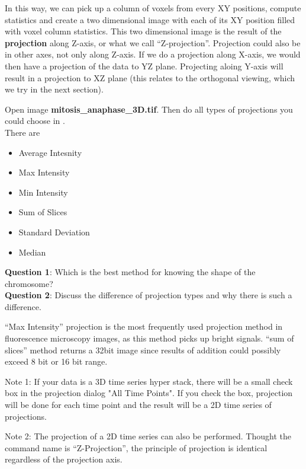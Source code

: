 In this way, we can pick up a column of voxels from every XY positions, compute statistics and create a two dimensional image with each of its XY position filled with voxel column statistics. This two dimensional image is the result of the \textbf{projection} along Z-axis, or what we call ``Z-projection''. Projection could also be in other axes, not only along Z-axis. If we do a projection along X-axis, we would then have a projection of the data to YZ plane. Projecting aloing Y-axis will result in a projection to XZ plane (this relates to the orthogonal viewing, which we try in the next section).

\begin{indentexercise}{2}
Open image \textbf{mitosis\_anaphase\_3D.tif}.
Then do all types of projections you could choose in .\\
There are 
\begin{itemize}

    \item Average Intesnity
\item Max Intensity
\item Min Intensity
\item Sum of Slices
\item Standard Deviation
\item Median
\end{itemize}

\textbf{Question 1}: Which is the best method for knowing the shape of the chromosome?\\
\textbf{Question 2}: Discuss the difference of projection types and why there is such a difference.  
\end{indentexercise}

``Max Intensity'' projection is the most frequently used projection method in fluorescence microscopy images, as this method picks up bright signals. ``sum of slices'' method returns a 32bit image since results of addition could possibly exceed 8 bit or 16 bit range. 

Note 1: If your data is a 3D time series hyper stack, there will be a small check box in the projection dialog "All Time Points". If you check the box, projection will be done for each time point and the result will be a 2D time series of projections.

Note 2: The projection of a 2D time series can also be performed. Thought the command name is ``Z-Projection'', the principle of projection is identical regardless of the projection axis.  

